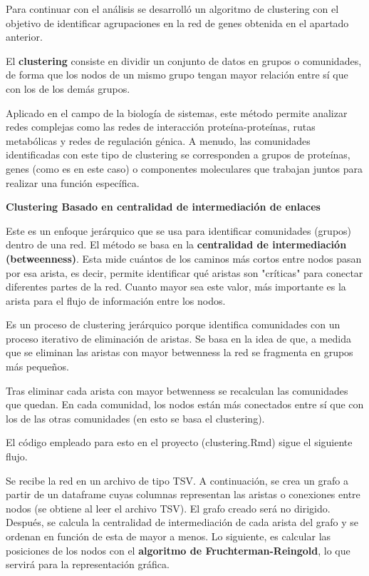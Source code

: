 Para continuar con el análisis se desarrolló un algoritmo de clustering con el objetivo de identificar agrupaciones en la red de genes obtenida en el apartado anterior.


El \textbf{clustering} consiste en dividir un conjunto de datos en grupos o comunidades, de forma que los nodos de un mismo grupo tengan mayor relación entre sí que con los de los demás grupos.

Aplicado en el campo de la biología de sistemas, este método permite analizar redes complejas como las redes de interacción proteína-proteínas, rutas metabólicas y redes de regulación génica. A menudo, las comunidades identificadas con este tipo de clustering se corresponden a grupos de proteínas, genes (como es en este caso) o componentes moleculares que trabajan juntos para realizar una función específica.

\textbf{Clustering Basado en centralidad de intermediación de enlaces}

Este es un enfoque jerárquico que se usa para identificar comunidades (grupos) dentro de una red. El método se basa en la \textbf{centralidad de intermediación (betweenness)}. Esta mide cuántos de los caminos más cortos entre nodos pasan por esa arista, es decir, permite identificar qué aristas son "críticas" para conectar diferentes partes de la red. Cuanto mayor sea este valor, más importante es la arista para el flujo de información entre los nodos.

Es un proceso de clustering jerárquico porque identifica comunidades con un proceso iterativo de eliminación de aristas. Se basa en la idea de que, a medida que se eliminan las aristas con mayor betwenness la red se fragmenta en grupos más pequeños.

Tras eliminar cada arista con mayor betwenness se recalculan las comunidades que quedan. En cada comunidad, los nodos están más conectados entre sí que con los de las otras comunidades (en esto se basa el clustering).

El código empleado para esto en el proyecto (clustering.Rmd) sigue el siguiente flujo.

Se recibe la red en un archivo de tipo TSV. A continuación, se crea un grafo a partir de un dataframe cuyas columnas representan las aristas o conexiones entre nodos (se obtiene al leer el archivo TSV). El grafo creado será no dirigido. Después, se calcula la centralidad de intermediación de cada arista del grafo y se ordenan en función de esta de mayor a menos. Lo siguiente, es calcular las posiciones de los nodos con el \textbf{algoritmo de Fruchterman-Reingold}, lo que servirá para la representación gráfica.

